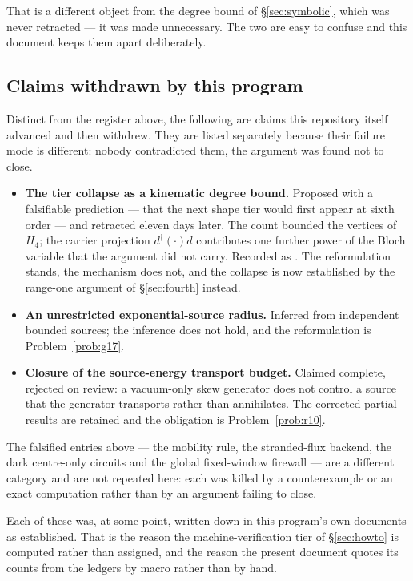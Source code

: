 That is a different object from the degree bound of
\S\ref{sec:symbolic}, which was never retracted --- it was made
unnecessary. The two are easy to confuse and this document keeps them
apart deliberately.

\medskip


\subsection{Claims withdrawn by this program}

Distinct from the register above, the following are claims this
repository itself advanced and then withdrew. They are listed separately
because their failure mode is different: nobody contradicted them, the
argument was found not to close.

\begin{itemize}
  \item \textbf{The tier collapse as a kinematic degree bound.}
    Proposed with a falsifiable prediction --- that the next shape tier
    would first appear at sixth order --- and retracted eleven days
    later. The count bounded the vertices of $H_4$; the carrier
    projection $d^{\dagger}(\cdot)d$ contributes one further power of
    the Bloch variable that the argument did not carry. Recorded as
    . The
    reformulation stands, the mechanism does not, and the collapse is
    now established by the range-one argument of \S\ref{sec:fourth}
    instead.
  \item \textbf{An unrestricted exponential-source radius.} Inferred from
    independent bounded sources; the inference does not hold, and the
    reformulation is Problem~\ref{prob:g17}.
  \item \textbf{Closure of the source-energy transport budget.} Claimed
    complete, rejected on review: a vacuum-only skew generator does not
    control a source that the generator transports rather than
    annihilates. The corrected partial results are retained and the
    obligation is Problem~\ref{prob:r10}.
\end{itemize}

\noindent The falsified entries above --- the mobility rule, the
stranded-flux backend, the dark centre-only circuits and the global
fixed-window firewall --- are a different category and are not repeated
here: each was killed by a counterexample or an exact computation
rather than by an argument failing to close.

Each of these was, at some point, written down in this program's own
documents as established. That is the reason the machine-verification
tier of \S\ref{sec:howto} is computed rather than assigned, and the
reason the present document quotes its counts from the ledgers by macro
rather than by hand.
